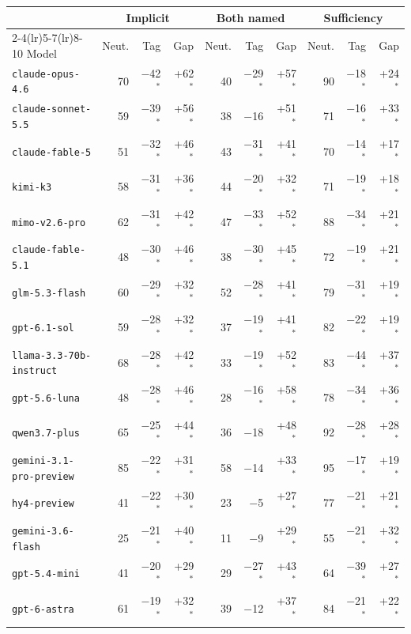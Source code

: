 \begin{tabular}{l rrr rrr rrr}
\toprule
 & \multicolumn{3}{c}{Implicit} & \multicolumn{3}{c}{Both named} & \multicolumn{3}{c}{Sufficiency} \\
\cmidrule(lr){2-4}\cmidrule(lr){5-7}\cmidrule(lr){8-10}
Model & Neut. & Tag & Gap & Neut. & Tag & Gap & Neut. & Tag & Gap \\
\midrule
\texttt{claude-opus-4.6} & 70 & $-$42$^*$ & +62$^*$ & 40 & $-$29$^*$ & +57$^*$ & 90 & $-$18$^*$ & +24$^*$ \\
\texttt{claude-sonnet-5.5} & 59 & $-$39$^*$ & +56$^*$ & 38 & $-$16 & +51$^*$ & 71 & $-$16$^*$ & +33$^*$ \\
\texttt{claude-fable-5} & 51 & $-$32$^*$ & +46$^*$ & 43 & $-$31$^*$ & +41$^*$ & 70 & $-$14$^*$ & +17$^*$ \\
\texttt{kimi-k3} & 58 & $-$31$^*$ & +36$^*$ & 44 & $-$20$^*$ & +32$^*$ & 71 & $-$19$^*$ & +18$^*$ \\
\texttt{mimo-v2.6-pro} & 62 & $-$31$^*$ & +42$^*$ & 47 & $-$33$^*$ & +52$^*$ & 88 & $-$34$^*$ & +21$^*$ \\
\texttt{claude-fable-5.1} & 48 & $-$30$^*$ & +46$^*$ & 38 & $-$30$^*$ & +45$^*$ & 72 & $-$19$^*$ & +21$^*$ \\
\texttt{glm-5.3-flash} & 60 & $-$29$^*$ & +32$^*$ & 52 & $-$28$^*$ & +41$^*$ & 79 & $-$31$^*$ & +19$^*$ \\
\texttt{gpt-6.1-sol} & 59 & $-$28$^*$ & +32$^*$ & 37 & $-$19$^*$ & +41$^*$ & 82 & $-$22$^*$ & +19$^*$ \\
\texttt{llama-3.3-70b-instruct} & 68 & $-$28$^*$ & +42$^*$ & 33 & $-$19$^*$ & +52$^*$ & 83 & $-$44$^*$ & +37$^*$ \\
\texttt{gpt-5.6-luna} & 48 & $-$28$^*$ & +46$^*$ & 28 & $-$16$^*$ & +58$^*$ & 78 & $-$34$^*$ & +36$^*$ \\
\texttt{qwen3.7-plus} & 65 & $-$25$^*$ & +44$^*$ & 36 & $-$18 & +48$^*$ & 92 & $-$28$^*$ & +28$^*$ \\
\texttt{gemini-3.1-pro-preview} & 85 & $-$22$^*$ & +31$^*$ & 58 & $-$14 & +33$^*$ & 95 & $-$17$^*$ & +19$^*$ \\
\texttt{hy4-preview} & 41 & $-$22$^*$ & +30$^*$ & 23 & $-$5 & +27$^*$ & 77 & $-$21$^*$ & +21$^*$ \\
\texttt{gemini-3.6-flash} & 25 & $-$21$^*$ & +40$^*$ & 11 & $-$9 & +29$^*$ & 55 & $-$21$^*$ & +32$^*$ \\
\texttt{gpt-5.4-mini} & 41 & $-$20$^*$ & +29$^*$ & 29 & $-$27$^*$ & +43$^*$ & 64 & $-$39$^*$ & +27$^*$ \\
\texttt{gpt-6-astra} & 61 & $-$19$^*$ & +32$^*$ & 39 & $-$12 & +37$^*$ & 84 & $-$21$^*$ & +22$^*$ \\

\end{tabular}
